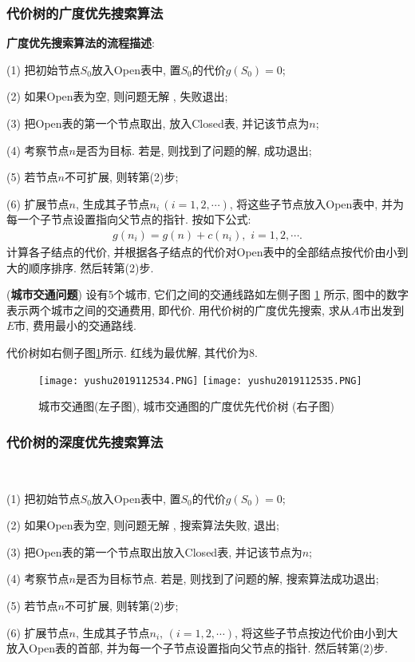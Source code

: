\subsubsection{代价树的广度优先搜索算法}

\textbf{广度优先搜索算法的流程描述}:

\quad (1) 把初始节点$S_0$放入Open表中, 置$S_0$的代价$g(S_0)=0$;

\quad (2) 如果Open表为空, 则问题无解 , 失败退出;

\quad (3) 把Open表的第一个节点取出, 放入Closed表, 并记该节点为$n$;

\quad (4) 考察节点$n$是否为目标. 若是, 则找到了问题的解, 成功退出;

\quad (5) 若节点$n$不可扩展, 则转第(2)步;

\quad (6) 扩展节点$n$, 生成其子节点$n_i\,(i=1, 2, \cdots)$, 将这些子节点放入Open表中, 并为每一个子节点设置指向父节点的指针. 按如下公式:
\begin{align}
    g(n_i)=g(n)+c(n_i),\,\,i=1,2,\cdots.
\end{align}
计算各子结点的代价, 并根据各子结点的代价对Open表中的全部结点按代价由小到大的顺序排序. 然后转第(2)步.
\begin{example}
    (\textbf{城市交通问题}) 设有5个城市, 它们之间的交通线路如左侧子图 \ref{AI32fig2019120234} 所示, 图中的数字表示两个城市之间的交通费用, 即代价.
    用代价树的广度优先搜索, 求从$A$市出发到$E$市, 费用最小的交通路线.
\end{example}
\begin{result}
代价树如右侧子图\ref{AI32fig2019120234}所示. 红线为最优解, 其代价为8.
\begin{figure}[H]
    \centering
    \texttt{[image: yushu2019112534.PNG]}
    \texttt{[image: yushu2019112535.PNG]}
    \caption{城市交通图(左子图), 城市交通图的广度优先代价树 (右子图)}
    \label{AI32fig2019120234}
\end{figure}
\subsubsection{代价树的深度优先搜索算法}~{}

\quad (1) 把初始节点$S_0$放入Open表中, 置$S_0$的代价$g(S_0)=0$;

\quad (2) 如果Open表为空, 则问题无解 , 搜索算法失败, 退出;

\quad (3) 把Open表的第一个节点取出放入Closed表, 并记该节点为$n$;

\quad (4) 考察节点$n$是否为目标节点. 若是, 则找到了问题的解, 搜索算法成功退出;

\quad (5) 若节点$n$不可扩展, 则转第(2)步;

\quad (6) 扩展节点$n$, 生成其子节点$n_i,\,(i=1, 2,\cdots)$, 将这些子节点按边代价由小到大放入Open表的首部, 并为每一个子节点设置指向父节点的指针. 然后转第(2)步.
\end{result}
